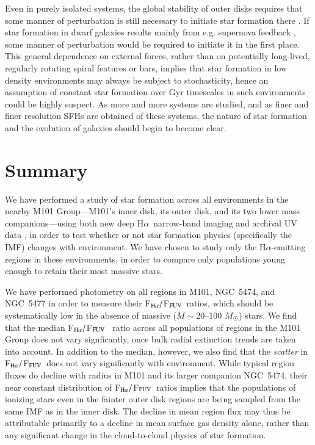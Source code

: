 \documentclass[iop]{emulateapj}
\newcommand{\ha}{H$\alpha$}
\newcommand{\hafuv}{F$_{\rm H\alpha}/$F$_{\rm FUV}$}
\begin{document}
Even in purely isolated systems, the global stability of outer
disks requires that some manner of perturbation is still necessary to
initiate star formation there \citep[e.g. substructure in the dark
  matter halo;][]{bush10}.  If star formation in dwarf galaxies
results mainly from e.g. supernova feedback \citep{vanzee97}, some
manner of perturbation would be required to initiate it in the first
place.  This general dependence on external forces, rather than on
potentially long-lived, regularly rotating spiral features or bars,
implies that star formation in low density environments may always be
subject to stochasticity, hence an assumption of constant star
formation over Gyr timescales in such environments could be highly
suspect.  As more and more systems are studied, and as finer and finer
resolution SFHs are obtained of these systems, the nature of star
formation and the evolution of galaxies should begin to become clear.

\section{Summary}

We have performed a study of star formation across all environments in
the nearby M101 Group---M101's inner disk, its outer disk, and its two
lower mass companions---using both new deep \ha \ narrow-band imaging and
archival UV data \citep[\emph{GALEX} NGS and PI data;][]{bianchi03,
  bigiel10}, in order to test whether or not star formation physics
(specifically the IMF) changes with environment.  We have chosen to
study only the \ha-emitting  regions in these environments,
in order to compare only populations young enough to retain their most
massive stars.

We have performed photometry on all  regions in M101,
NGC~5474, and NGC~5477 in order to measure their \hafuv \ ratios,
which should be systematically low in the absence of massive ($M
\sim$20--100 $M_{\astrosun}$) stars.  We find that the median \hafuv
\ ratio across all populations of  regions in the M101 Group
does not vary signficantly, once bulk radial extinction trends are
taken into account.  In addition to the median, however, we also find
that the \emph{scatter} in \hafuv \ does not vary significantly with
environment.  While typical  region fluxes do decline with
radius in M101 and its larger companion NGC~5474, their near constant
distribution of \hafuv \ ratios implies that the populations of
ionizing stars even in the fainter outer disk  regions are
being sampled from the same IMF as in the inner disk.  The decline in
mean  region flux may thus be attributable primarily to a
decline in mean surface gas density alone, rather than any significant
change in the cloud-to-cloud physics of star formation.
\end{document}
